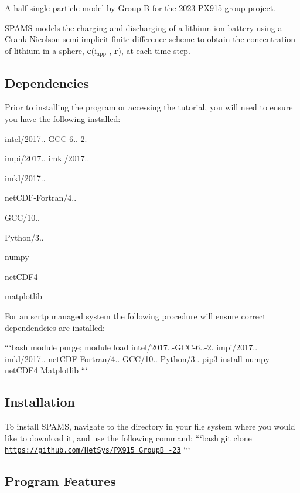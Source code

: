 A half single particle model by Group B for the 2023 P\-X915 group project.

S\-P\-A\-M\-S models the charging and discharging of a lithium ion battery using a Crank-\/\-Nicolson semi-\/implicit finite difference scheme to obtain the concentration of lithium in a sphere, {\bfseries c}(i$_{\mbox{app}}$ , {\bfseries r}), at each time step.

\subsection*{Dependencies}

Prior to installing the program or accessing the tutorial, you will need to ensure you have the following installed\-:


\begin{DoxyItemize}
\item intel/2017..-\/\-G\-C\-C-\/6..-\/2.
\item impi/2017.. imkl/2017..
\item imkl/2017..
\item net\-C\-D\-F-\/\-Fortran/4..
\item G\-C\-C/10..
\item Python/3..
\item numpy
\item net\-C\-D\-F4
\item matplotlib
\end{DoxyItemize}

For an scrtp managed system the following procedure will ensure correct dependendcies are installed\-:

```bash module purge; module load intel/2017..-\/\-G\-C\-C-\/6..-\/2. impi/2017.. imkl/2017.. net\-C\-D\-F-\/\-Fortran/4.. G\-C\-C/10.. Python/3.. pip3 install numpy net\-C\-D\-F4 Matplotlib ```

\subsection*{Installation}

To install S\-P\-A\-M\-S, navigate to the directory in your file system where you would like to download it, and use the following command\-: ```bash git clone \href{https://github.com/HetSys/PX915_GroupB_22-23}{\tt https\-://github.\-com/\-Het\-Sys/\-P\-X915\-\_\-\-Group\-B\-\_-\/23} ```

\subsection*{Program Features}

